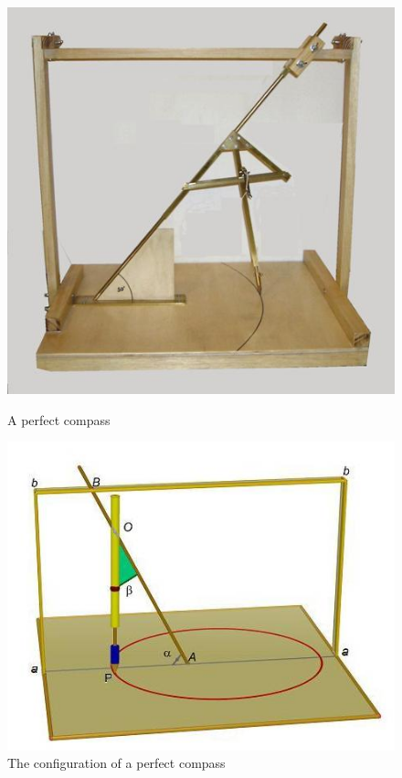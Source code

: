 \documentclass[11pt,a4paper]{report}
\begin{document}
\begin{figure}[h]
\begin{minipage}{.45\textwidth}
\begin{center}
\includegraphics[width=.9\textwidth,keepaspectratio=true]{perfect1.jpg}
\medskip
\caption{A perfect compass}\label{f.perfect-image1}
\end{center}
\end{minipage}
\hfill
\begin{minipage}{.55\textwidth}
\begin{center}
\includegraphics[width=\textwidth,keepaspectratio=true]{perfect2.jpg}
\caption{The configuration of a perfect compass}\label{f.perfect-image2}
\end{center}
\end{minipage}
\end{figure}
\end{document}
